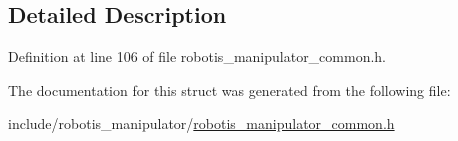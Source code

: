 \subsection{Detailed Description}


Definition at line 106 of file robotis\+\_\+manipulator\+\_\+common.\+h.



The documentation for this struct was generated from the following file\+:\begin{DoxyCompactItemize}
\item 
include/robotis\+\_\+manipulator/\hyperlink{robotis__manipulator__common_8h}{robotis\+\_\+manipulator\+\_\+common.\+h}\end{DoxyCompactItemize}
